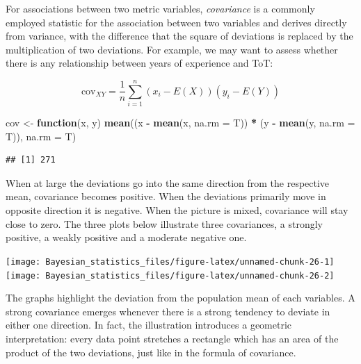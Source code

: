 \documentclass[]{svmono}
\newenvironment{Shaded}{\begin{snugshade}}{\end{snugshade}}
\newcommand{\KeywordTok}[1]{\textcolor[rgb]{0.13,0.29,0.53}{\textbf{#1}}}
\newcommand{\DataTypeTok}[1]{\textcolor[rgb]{0.13,0.29,0.53}{#1}}
\newcommand{\StringTok}[1]{\textcolor[rgb]{0.31,0.60,0.02}{#1}}
\newcommand{\ControlFlowTok}[1]{\textcolor[rgb]{0.13,0.29,0.53}{\textbf{#1}}}
\newcommand{\OperatorTok}[1]{\textcolor[rgb]{0.81,0.36,0.00}{\textbf{#1}}}
\newcommand{\NormalTok}[1]{#1}
\begin{document}
For associations between two metric variables, \emph{covariance} is a
commonly employed statistic for the association between two variables
and derives directly from variance, with the difference that the square
of deviations is replaced by the multiplication of two deviations. For
example, we may want to assess whether there is any relationship between
years of experience and ToT:

\[
\textrm{cov}_{XY} = \frac{1}{n} \sum_{i=1}^n (x_i - E(X)) (y_i - E(Y))
\]

\begin{Shaded}
\begin{Highlighting}[]
\NormalTok{cov <-}\StringTok{ }\ControlFlowTok{function}\NormalTok{(x, y)}
  \KeywordTok{mean}\NormalTok{((x }\OperatorTok{-}\StringTok{ }\KeywordTok{mean}\NormalTok{(x, }\DataTypeTok{na.rm =}\NormalTok{ T)) }\OperatorTok{*}\StringTok{ }\NormalTok{(y }\OperatorTok{-}\StringTok{ }\KeywordTok{mean}\NormalTok{(y, }\DataTypeTok{na.rm =}\NormalTok{ T)), }\DataTypeTok{na.rm =}\NormalTok{ T)}
\end{Highlighting}
\end{Shaded}

\begin{Shaded}
\end{Shaded}

\begin{verbatim}
## [1] 271
\end{verbatim}

When at large the deviations go into the same direction from the
respective mean, covariance becomes positive. When the deviations
primarily move in opposite direction it is negative. When the picture is
mixed, covariance will stay close to zero. The three plots below
illustrate three covariances, a strongly positive, a weakly positive and
a moderate negative one.

\texttt{[image: Bayesian\_statistics\_files/figure-latex/unnamed-chunk-26-1]}
\texttt{[image: Bayesian\_statistics\_files/figure-latex/unnamed-chunk-26-2]}

The graphs highlight the deviation from the population mean of each
variables. A strong covariance emerges whenever there is a strong
tendency to deviate in either one direction. In fact, the illustration
introduces a geometric interpretation: every data point stretches a
rectangle which has an area of the product of the two deviations, just
like in the formula of covariance.
\end{document}
